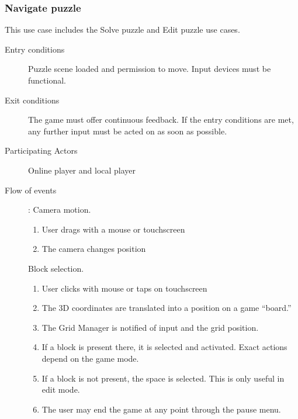\documentclass[12pt]{article}
\begin{document}
    \subsubsection{Navigate puzzle}
    This use case includes the Solve puzzle and Edit puzzle use cases.
    \begin{description}
        \item[Entry conditions] Puzzle scene loaded and permission to move.
            Input devices must be functional.
        \item[Exit conditions] The game must offer continuous feedback.
            If the entry conditions are met, any further input must be
            acted on as soon as possible.
        \item[Participating Actors] Online player and local player
        \item[Flow of events]:
            Camera motion.
            \begin{enumerate}
                \item User drags with a mouse or touchscreen
                \item The camera changes position
            \end{enumerate}

            Block selection.
            \begin{enumerate}
                \item User clicks with mouse or taps on touchscreen
                \item The 3D coordinates are translated into a position on
                    a game ``board.''
                \item The Grid Manager is notified of input and the grid
                    position.
                \item If a block is present there, it is selected and activated.
                    Exact actions depend on the game mode.
                \item If a block is not present, the space is selected. This
                    is only useful in edit mode.
                \item The user may end the game at any point through the pause
                    menu.
            \end{enumerate}

    \end{description}


\end{document}
